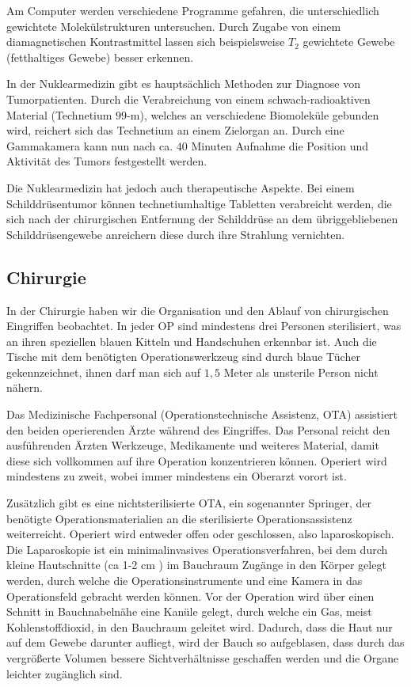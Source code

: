 \documentclass[11pt,a4paper,titlepage]{scrartcl}
\begin{document}
Am Computer werden verschiedene Programme gefahren, die unterschiedlich gewichtete Molekülstrukturen untersuchen.
Durch Zugabe von einem diamagnetischen Kontrastmittel lassen sich beispielsweise $T_2$ gewichtete Gewebe (fetthaltiges Gewebe) besser erkennen. \medskip

In der Nuklearmedizin gibt es hauptsächlich Methoden zur Diagnose von Tumorpatienten.
Durch die Verabreichung von einem schwach-radioaktiven Material (Technetium $99$-m), welches an verschiedene Biomoleküle gebunden wird, reichert sich das Technetium an einem Zielorgan an.
Durch eine Gammakamera kann nun nach ca. $40$ Minuten Aufnahme die Position und Aktivität des Tumors festgestellt werden. \medskip

Die Nuklearmedizin hat jedoch auch therapeutische Aspekte.
Bei einem Schilddrüsentumor können technetiumhaltige Tabletten verabreicht werden, die sich nach der chirurgischen Entfernung der Schilddrüse an dem übriggebliebenen Schilddrüsengewebe anreichern diese durch ihre Strahlung vernichten. \medskip






\subsection{Chirurgie}

In der Chirurgie haben wir die Organisation und den Ablauf von chirurgischen Eingriffen beobachtet.
In jeder OP sind mindestens drei Personen sterilisiert, was an ihren speziellen blauen Kitteln und Handschuhen erkennbar ist.
Auch die Tische mit dem benötigten Operationswerkzeug sind durch blaue Tücher gekennzeichnet, ihnen darf man sich auf $1,5$ Meter als unsterile Person nicht nähern. \medskip

Das Medizinische Fachpersonal (Operationstechnische Assistenz, OTA) assistiert den beiden operierenden Ärzte während des Eingriffes.
Das Personal reicht den ausführenden Ärzten Werkzeuge, Medikamente und weiteres Material, damit diese sich vollkommen auf ihre Operation konzentrieren können.
Operiert wird mindestens zu zweit, wobei immer mindestens ein Oberarzt vorort ist. \medskip

Zusätzlich gibt es eine nichtsterilisierte OTA, ein sogenannter Springer, der benötigte Operationsmaterialien an die sterilisierte Operationsassistenz weiterreicht.
Operiert wird entweder offen oder geschlossen, also laparoskopisch.
Die Laparoskopie ist ein minimalinvasives Operationsverfahren, bei dem durch kleine Hautschnitte (ca 1-2 cm \cite{Laparoskopie}) im Bauchraum Zugänge in den Körper gelegt werden, durch welche die Operationsinstrumente und eine Kamera in das Operationsfeld gebracht werden können.
Vor der Operation wird über einen Schnitt in Bauchnabelnähe eine Kanüle gelegt, durch welche ein Gas, meist Kohlenstoffdioxid, in den Bauchraum geleitet wird.
Dadurch, dass die Haut nur auf dem Gewebe darunter aufliegt, wird der Bauch so aufgeblasen, dass durch das vergrößerte Volumen bessere Sichtverhältnisse geschaffen werden und die Organe leichter zugänglich sind. \medskip
\end{document}
